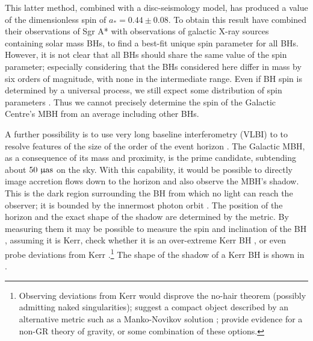 This latter method, combined with a disc-seismology model, has produced a value of the dimensionless spin of $a_\ast = 0.44 \pm 0.08$. To obtain this result \citet{Kato2010} have combined their observations of Sgr A* with observations of galactic X-ray sources containing solar mass BHs, to find a best-fit unique spin parameter for all BHs. However, it is not clear that all BHs should share the same value of the spin parameter; especially considering that the BHs considered here differ in mass by six orders of magnitude, with none in the intermediate range. Even if BH spin is determined by a universal process, we still expect some distribution of spin parameters \citep{King2008, Berti2008}. Thus we cannot precisely determine the spin of the Galactic Centre's MBH from an average including other BHs.

A further possibility is to use very long baseline interferometry (VLBI) to to resolve features of the size of the order of the event horizon \citep{Doeleman2008}. The Galactic MBH, as a consequence of its mass and proximity, is the prime candidate, subtending about $50~\mathrm{\upmu as}$ on the sky\cite{Broderick2009}. With this capability, it would be possible to directly image accretion flows down to the horizon and also observe the MBH's shadow. This is the dark region surrounding the BH from which no light can reach the observer; it is bounded by the innermost photon orbit \citep[section 63]{Chandrasekhar1992}. The position of the horizon and the exact shape of the shadow are determined by the metric. By measuring them it may be possible to measure the spin and inclination of the BH \citep{Hioki2009a}, assuming it is Kerr, check whether it is an over-extreme Kerr BH \citep{Bambi2009}, or even probe deviations from Kerr \citep{Johannsen2010a, Johannsen2010b}.\footnote{Observing deviations from Kerr would disprove the no-hair theorem (possibly admitting naked singularities); suggest a compact object described by an alternative metric such as a Manko-Novikov solution \citep{Manko1992, Gair2008a}; provide evidence for a non-GR theory of gravity, or some combination of these options.} The shape of the shadow of a Kerr BH is shown in .
